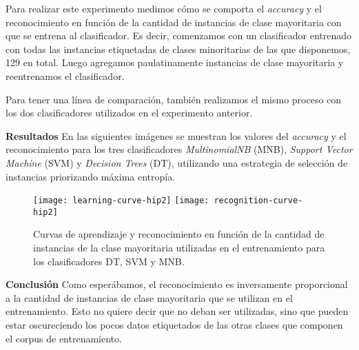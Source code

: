 Para realizar este experimento medimos cómo se comporta el \textit{accuracy} y el reconocimiento en función de la cantidad de instancias de clase mayoritaria con que se entrena al clasificador. Es decir, comenzamos con un clasificador entrenado con todas las instancias etiquetadas de clases minoritarias de las que disponemos, 129 en total. Luego agregamos paulatinamente instancias de clase mayoritaria y reentrenamos el clasificador.

Para tener una línea de comparación, también realizamos el mismo proceso con los dos clasificadores utilizados en el experimento anterior.

\vspace{3 mm}

\textbf{Resultados} En las siguientes imágenes se muestran los valores del \textit{accuracy} y el reconocimiento para los tres clasificadores \textit{MultinomialNB} (MNB), \textit{Support Vector Machine} (SVM) y \textit{Decision Trees} (DT), utilizando una estrategia de selección de instancias priorizando máxima entropía.

\begin{figure}[h!]
\texttt{[image: learning-curve-hip2]}
\texttt{[image: recognition-curve-hip2]}
\caption{Curvas de aprendizaje y reconocimiento en función de la cantidad de instancias de la clase mayoritaria utilizadas en el entrenamiento para los clasificadores DT, SVM y MNB.}\label{curva-apr-hip2}
\centering
\end{figure}

\vspace{3 mm}

\textbf{Conclusión}
Como esperábamos, el reconocimiento es inversamente proporcional a la cantidad de instancias de clase mayoritaria que se utilizan en el entrenamiento. Esto no quiere decir que no deban ser utilizadas, sino que pueden estar oscureciendo los pocos datos etiquetados de las otras clases que componen el corpus de entrenamiento.

